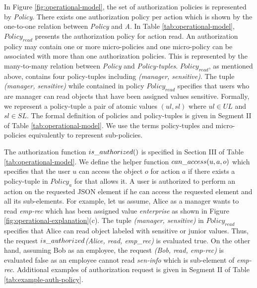 In Figure \ref{fig:operational-model}, the set of authorization policies is represented by \textit{Policy}. There exists one authorization policy per action which is shown by the one-to-one relation between  \textit{Policy} and \textit{A}. In Table \ref{tab:operational-model}, $Policy_{read}$ presents the authorization policy for  action read. An authorization policy may contain one or more micro-policies and one micro-policy can be associated with more than one authorization policies. This is represented by the many-to-many relation between \textit{Policy} and \textit{Policy-tuples}. $Policy_{read}$, as mentioned above, contains four policy-tuples including \textit{(manager, sensitive)}. The tuple \textit{(manager, sensitive)} while contained in policy $Policy_{read}$ specifies that users who are manager can read objects that have been assigned values sensitive. Formally, we represent a policy-tuple a pair of atomic values $(ul, sl)$ where $ul \in UL$ and $sl \in SL$. The formal definition of policies and policy-tuples is given in Segment II of Table \ref{tab:operational-model}. We use the terms policy-tuples and micro-policies equivalently to represent sub-policies.


The authorization function $is\_authorized{}()$ is specified in Section III of Table \ref{tab:operational-model}. We define the helper function $can\_access{}(u,a,o)$ which specifies that the user $u$ can access the object $o$ for action $a$ if there exists a policy-tuple in $Policy_{a}$ for that allows it. A user is authorized to perform an action on the requested JSON element  if he can access the requested element and all its sub-elements. For example, let us assume, Alice as a manager wants to read \textit{emp-rec} which has been assigned value \textit{enterprise} as shown in Figure \ref{fig:operational-explanation}(c). The tuple \textit{(manager, sensitive)} in $Policy_{read}$ specifies that Alice can read object labeled with sensitive or junior values. Thus, the request $is\_authorized$\textit{(Alice, read, emp\_rec)} is evaluated true. On the other hand, assuming Bob as an employee, the request \textit{\request(Bob, read, emp-rec)} is evaluated false as an employee cannot read \textit{sen-info} which is sub-element of \textit{emp-rec}. Additional examples of authorization request is given in Segment II of Table  \ref{tab:example-auth-policy}.


